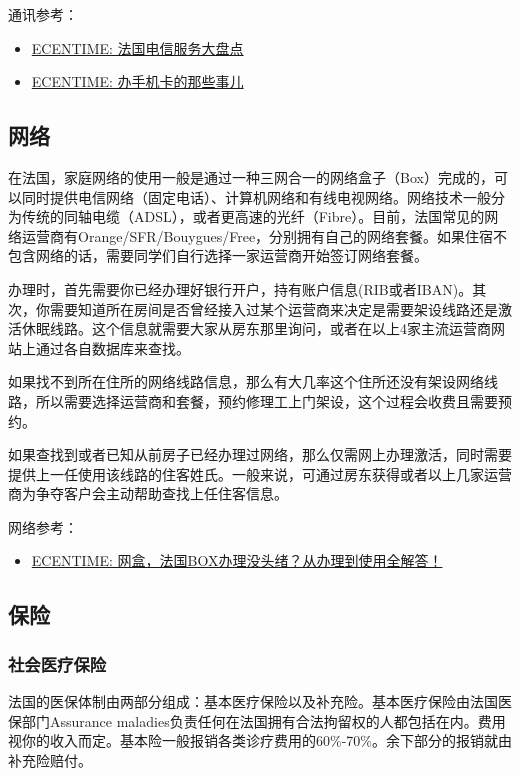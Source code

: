 \documentclass[UTF8]{ctexart}
\begin{document}
通讯参考：
\begin{itemize}
    \item \href{https://www.ecentime.com/article/forfait-mobile-france}{ECENTIME: 法国电信服务大盘点}
    \item \href{https://www.ecentime.com/article/carte-sim}{ECENTIME: 办手机卡的那些事儿}
\end{itemize}

\subsection{网络}

在法国，家庭网络的使用一般是通过一种三网合一的网络盒子（Box）完成的，可以同时提供电信网络（固定电话）、计算机网络和有线电视网络。网络技术一般分为传统的同轴电缆（ADSL），或者更高速的光纤（Fibre）。目前，法国常见的网络运营商有Orange/SFR/Bouygues/Free，分别拥有自己的网络套餐。如果住宿不包含网络的话，需要同学们自行选择一家运营商开始签订网络套餐。

办理时，首先需要你已经办理好银行开户，持有账户信息(RIB或者IBAN)。其次，你需要知道所在房间是否曾经接入过某个运营商来决定是需要架设线路还是激活休眠线路。这个信息就需要大家从房东那里询问，或者在以上4家主流运营商网站上通过各自数据库来查找。

如果找不到所在住所的网络线路信息，那么有大几率这个住所还没有架设网络线路，所以需要选择运营商和套餐，预约修理工上门架设，这个过程会收费且需要预约。

如果查找到或者已知从前房子已经办理过网络，那么仅需网上办理激活，同时需要提供上一任使用该线路的住客姓氏。一般来说，可通过房东获得或者以上几家运营商为争夺客户会主动帮助查找上任住客信息。

网络参考：
\begin{itemize}
    \item \href{https://www.ecentime.com/article/network-box-in-france}{ECENTIME: 网盒，法国BOX办理没头绪？从办理到使用全解答！}
\end{itemize}

\subsection{保险}
\subsubsection{社会医疗保险}

法国的医保体制由两部分组成：基本医疗保险以及补充险。基本医疗保险由法国医保部门Assurance maladies负责任何在法国拥有合法拘留权的人都包括在内。费用视你的收入而定。基本险一般报销各类诊疗费用的60\%-70\%。余下部分的报销就由补充险赔付。
\end{document}
